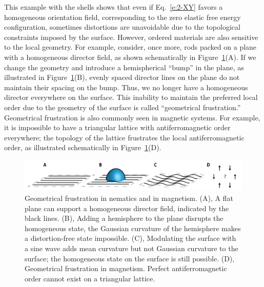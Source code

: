 This example with the shells shows that even if Eq.~\ref{e:2-XY} favors a homogeneous orientation field, corresponding to the zero elastic free energy configuration, sometimes distortions are unavoidable due to the topological constraints imposed by the surface.
However, ordered materials are also sensitive to the local geometry.
For example, consider, once more, rods packed on a plane with a homogeneous director field, as shown schematically in Figure~\ref{f:1-ParallelTransport}(A).
If we change the geometry and introduce a hemispherical ``bump'' in the plane, as illustrated in Figure~\ref{f:1-ParallelTransport}(B), evenly spaced director lines on the plane do not maintain their spacing on the bump.
Thus, we no longer have a homogeneous director everywhere on the surface.
This inability to maintain the preferred local order due to the geometry of the surface is called ``geometrical frustration.''
Geometrical frustration is also commonly seen in magnetic systems.
For example, it is impossible to have a triangular lattice with antiferromagnetic order everywhere; the topology of the lattice frustrates the local antiferromagnetic order, as illustrated schematically in Figure~\ref{f:1-ParallelTransport}(D).
\begin{figure}
  \centering
  \includegraphics{figures/C1/Ch1-Figs_ParallelTransport.png}
  \caption{Geometrical frustration in nematics and in magnetism.
  (A), A flat plane can support a homogeneous director field, indicated by the black lines.
  (B), Adding a hemisphere to the plane disrupts the homogeneous state, the Gaussian curvature of the hemisphere makes a distortion-free state impossible.
  (C), Modulating the surface with a sine wave adds mean curvature but not Gaussian curvature to the surface; the homogeneous state on the surface is still possible.
  (D), Geometrical frustration in magnetism. Perfect antiferromagnetic order cannot exist on a triangular lattice.}\label{f:1-ParallelTransport}
\end{figure}

